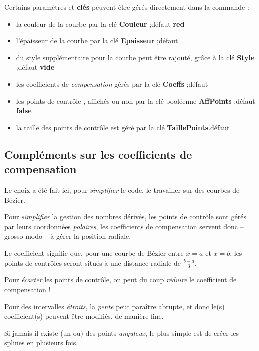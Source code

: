 \documentclass[a4paper,french,11pt]{article}
\newcommand\ctex[1]{\tcbox[vignettelatex]{#1}}
\newcommand\Cle[1]{{\bfseries\sffamily\textlangle #1\textrangle}}
\begin{document}
\begin{codecles}
Certains paramètres et \Cle{clés} peuvent être gérés directement dans la commande \ctex{splinetikz} :
%
\begin{itemize}
	\item la couleur de la courbe par la {clé} \Cle{Couleur} ;\hfill{}défaut \Cle{red}
	\item l'épaisseur de la courbe par la {clé} \Cle{Epaisseur} ;\hfill{}défaut \Cle{1.25pt}
	\item du style supplémentaire pour la courbe peut être rajouté, grâce à la {clé} \Cle{Style} ;\hfill{}défaut \Cle{vide}
	\item les coefficients de \textit{compensation} gérés par la {clé} \Cle{Coeffs} ;\hfill{}défaut \Cle{3}
	\item les points de contrôle , affichés ou non par la {clé booléenne} \Cle{AffPoints} ;\hfill{}défaut \Cle{false}
	\item la taille des points de contrôle est géré par la {clé} \Cle{TaillePoints}.\hfill{}défaut \Cle{2pt}
\end{itemize}
\end{codecles}

\subsection{Compléments sur les coefficients de \og compensation \fg}

\begin{codeidee}
Le choix a été fait ici, pour \textit{simplifier} le code, le travailler sur des courbes de Bézier.

Pour \textit{simplifier} la gestion des nombres dérivés, les points de contrôle sont gérés par leurs coordonnées \textit{polaires}, les \textsf{coefficients de compensation} servent donc -- grosso modo -- à gérer la position radiale.

\smallskip

Le coefficient \Cle{3} signifie que, pour une courbe de Bézier entre $x=a$ et $x=b$, les points de contrôles seront situés à une distance radiale de $\frac{b-a}{3}$.

Pour \textit{écarter} les points de contrôle, on peut du coup \textit{réduire} le coefficient de compensation !

\medskip

Pour des intervalles \textit{étroits}, la \textit{pente} peut paraître abrupte, et donc le(s) coefficient(s) peuvent être modifiés, de manière fine.

\medskip

Si jamais il existe (un ou) des points \textit{anguleux}, le plus simple est de créer les splines en plusieurs fois.
\end{codeidee}
\end{document}
